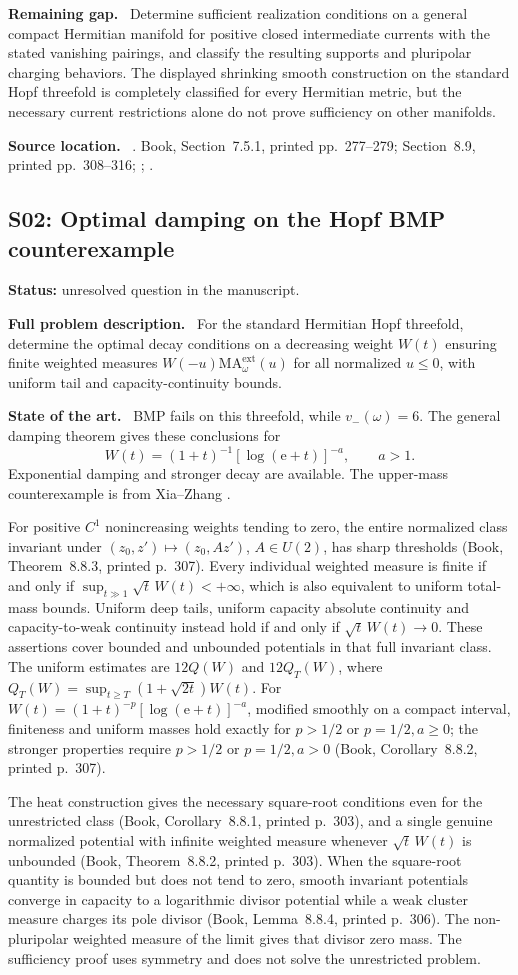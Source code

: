 \documentclass[11pt]{article}
\newcommand{\field}[1]{\par\medskip\noindent\textbf{#1.}\ }
\begin{document}
\field{Remaining gap} Determine sufficient realization conditions on a general compact Hermitian manifold for positive closed intermediate currents with the stated vanishing pairings, and classify the resulting supports and pluripolar charging behaviors. The displayed shrinking smooth construction on the standard Hopf threefold is completely classified for every Hermitian metric, but the necessary current restrictions alone do not prove sufficiency on other manifolds.
\field{Source location} . Book, Section~7.5.1, printed pp.~277--279; Section~8.9, printed pp.~308--316; ; .
\subsection{S02: Optimal damping on the Hopf BMP counterexample}
\label{S02}
\noindent\textbf{Status:} unresolved question in the manuscript.
\field{Full problem description} For the standard Hermitian Hopf threefold, determine the optimal decay conditions on a decreasing weight $W(t)$ ensuring finite weighted measures $W(-u)\mathrm{MA}^{\mathrm{ext}}_\omega(u)$ for all normalized $u\leq0$, with uniform tail and capacity-continuity bounds.
\field{State of the art} BMP fails on this threefold, while $v_-(\omega)=6$. The general damping theorem gives these conclusions for
\[W(t)=(1+t)^{-1}[\log(\mathrm e+t)]^{-a},\qquad a>1.\]
Exponential damping and stronger decay are available. The upper-mass counterexample is from Xia--Zhang \cite{XZ26}.\par For positive $C^1$ nonincreasing weights tending to zero, the entire normalized class invariant under $(z_0,z')\mapsto(z_0,Az')$, $A\in U(2)$, has sharp thresholds (Book, Theorem~8.8.3, printed p.~307). Every individual weighted measure is finite if and only if $\sup_{t\gg1}\sqrt t\,W(t)<+\infty$, which is also equivalent to uniform total-mass bounds. Uniform deep tails, uniform capacity absolute continuity and capacity-to-weak continuity instead hold if and only if $\sqrt t\,W(t)\to0$. These assertions cover bounded and unbounded potentials in that full invariant class. The uniform estimates are $12Q(W)$ and $12Q_T(W)$, where $Q_T(W)=\sup_{t\geq T}(1+\sqrt{2t})W(t)$. For $W(t)=(1+t)^{-p}[\log(\mathrm e+t)]^{-a}$, modified smoothly on a compact interval, finiteness and uniform masses hold exactly for $p>1/2$ or $p=1/2,a\geq0$; the stronger properties require $p>1/2$ or $p=1/2,a>0$ (Book, Corollary~8.8.2, printed p.~307).\par The heat construction gives the necessary square-root conditions even for the unrestricted class (Book, Corollary~8.8.1, printed p.~303), and a single genuine normalized potential with infinite weighted measure whenever $\sqrt t\,W(t)$ is unbounded (Book, Theorem~8.8.2, printed p.~303). When the square-root quantity is bounded but does not tend to zero, smooth invariant potentials converge in capacity to a logarithmic divisor potential while a weak cluster measure charges its pole divisor (Book, Lemma~8.8.4, printed p.~306). The non-pluripolar weighted measure of the limit gives that divisor zero mass. The sufficiency proof uses symmetry and does not solve the unrestricted problem.
\end{document}
